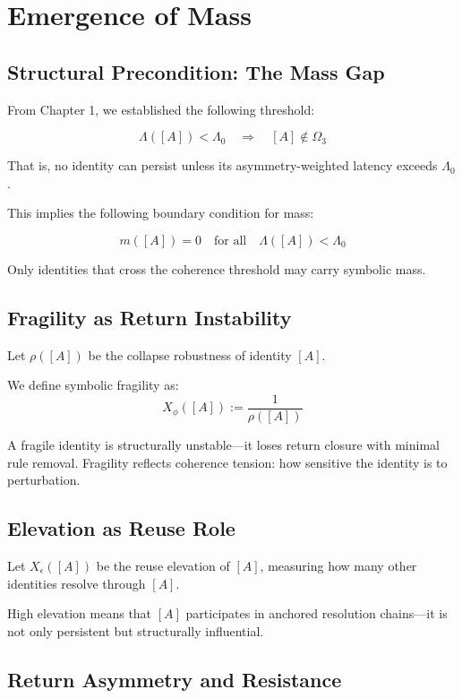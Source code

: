 \chapter{Emergence of Mass}

\section{Structural Precondition: The Mass Gap}

From Chapter 1, we established the following threshold:

\[
\Lambda([A]) < \Lambda_0 \quad \Rightarrow \quad [A] \notin \Omega_3
\]

That is, no identity can persist unless its asymmetry-weighted latency exceeds $\Lambda_0$.

This implies the following boundary condition for mass:

\[
m([A]) = 0 \quad \text{for all} \quad \Lambda([A]) < \Lambda_0
\]

Only identities that cross the coherence threshold may carry symbolic mass.

\section{Fragility as Return Instability}

Let $\rho([A])$ be the collapse robustness of identity $[A]$.

We define symbolic fragility as:
\begin{equation} \label{eq:fragility}
X_\phi([A]) := \frac{1}{\rho([A])}
\end{equation}

A fragile identity is structurally unstable—it loses return closure with minimal rule removal. Fragility reflects coherence tension: how sensitive the identity is to perturbation.

\section{Elevation as Reuse Role}

Let $X_\epsilon([A])$ be the reuse elevation of $[A]$, measuring how many other identities resolve through $[A]$.

High elevation means that $[A]$ participates in anchored resolution chains—it is not only persistent but structurally influential.

\section{Return Asymmetry and Resistance}

